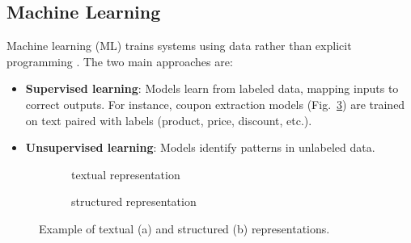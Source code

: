 \documentclass[licencjacka,en]{pracamgr}
\begin{document}
\subsection{Machine Learning}
Machine learning (ML) trains systems using data rather than explicit programming \cite{francuz_3}. The two main approaches are:

\begin{itemize}
    \item \textbf{Supervised learning}: Models learn from labeled data, mapping inputs to correct outputs. For instance, coupon extraction models (Fig.~\ref{list:input}) are trained on text paired with labels (product, price, discount, etc.).
    
    \item \textbf{Unsupervised learning}: Models identify patterns in unlabeled data.
\end{itemize}

\begin{figure}[ht]
    \centering
    \begin{subfigure}{0.9\textwidth}
        \caption{textual representation}
        \label{list:tr}
    \end{subfigure}

    \vspace{5mm}

    \begin{subfigure}{0.9\textwidth}
        \caption{structured representation}
        \label{list:sr}
    \end{subfigure}

    \caption{Example of textual (a) and structured (b) representations.}
    \label{list:input}
\end{figure}
\end{document}
